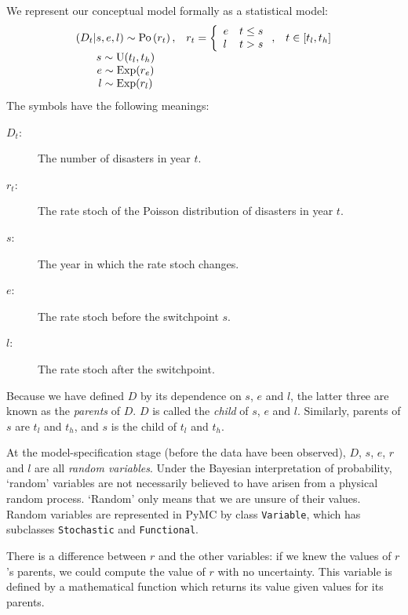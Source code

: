 We represent our conceptual model formally as a statistical model:
\begin{equation}
    \begin{array}{ccc}
        (D_t | s, e, l) \sim \textup{Po}\left(r_t\right), & r_t=\left\{\begin{array}{ll}
            e & t\le s\\ l & t>s
            \end{array}\right.,&t\in[t_l,t_h]\\
        s\sim \textup{U}(t_l, t_h)\\
        e\sim \textup{Exp}(r_e)\\
        l\sim \textup{Exp}(r_l)        
    \end{array}
    \label{disastermodel} 
\end{equation}
The symbols have the following meanings:
\begin{description}
    \item[$D_t$:] The number of disasters in year $t$.
    \item[$r_t$:] The rate stoch of the Poisson distribution of disasters in year $t$.
    \item[$s$:] The year in which the rate stoch changes.
    \item[$e$:] The rate stoch before the switchpoint $s$.
    \item[$l$:] The rate stoch after the switchpoint.
\end{description}
Because we have defined $D$ by its dependence on $s$, $e$ and $l$, the latter three are known as the \emph{parents} of $D$. $D$ is called the \emph{child} of $s$, $e$ and $l$. Similarly, parents of $s$ are $t_l$ and $t_h$, and $s$ is the child of $t_l$ and $t_h$.

At the model-specification stage (before the data have been observed), $D$, $s$, $e$, $r$ and $l$ are all \emph{random variables}. Under the Bayesian interpretation of probability, `random' variables are not necessarily believed to have arisen from a physical random process. `Random' only means that we are unsure of their values. Random variables are represented in PyMC by class \texttt{Variable}, which has subclasses \texttt{Stochastic} and \texttt{Functional}.

There is a difference between $r$ and the other variables: if we knew the values of $r$'s parents, we could compute the value of $r$ with no uncertainty. This variable is defined by a mathematical function which returns its value given values for its parents. 

